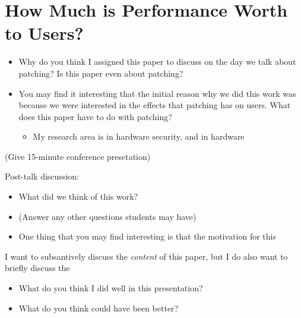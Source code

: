 \documentclass[11pt]{article}
\begin{document}
\section*{How Much is Performance Worth to Users?}

\begin{itemize}
    \item Why do you think I assigned this paper to discuss on the day we talk about patching? Is this paper even about patching?
    \item You may find it interesting that the initial reason why we did this work was because we were interested in the effects that patching has on users. What does this paper have to do with patching?
    \begin{itemize}
        \item My research area is in hardware security, and in hardware 
    \end{itemize}
\end{itemize}

(Give 15-minute conference presetation)

Post-talk discussion:
\begin{itemize}
    \item What did we think of this work?
    \item (Answer any other questions students may have)
    \item One thing that you may find interesting is that the motivation for this 
\end{itemize}

I want to subsantively discuss the {\it content} of this paper, but I do also want to briefly discuss the 
\begin{itemize}
    \item What do you think I did well in this presentation?
    \item What do you think could have been better?
\end{itemize}
\end{document}
